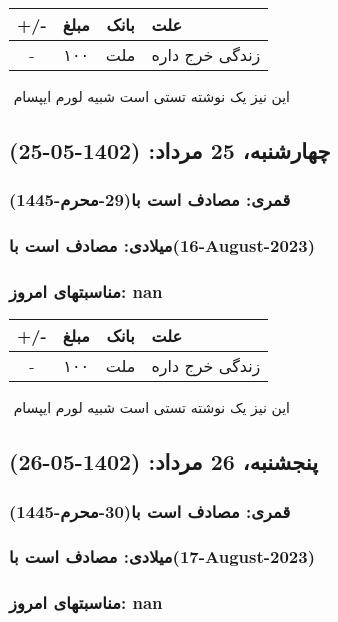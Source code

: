 \documentclass{article}
\newcommand{\rnote}[1]{\marginpar{\textcolor{color}{\StrSubstitute{\##1}{ }{\_}}}}
\newcommand{\myRow}[4]{
    #1 & #2 & #3 & #4 \\ \hline
}
\begin{document}
\begin{tabular}{ | c | c | c | p{5cm} |}
    \hline
    \myRow{ +/- }{مبلغ}{بانک}{علت}
    \myRow{-}{۱۰۰}{ملت}{زندگی خرج داره}
\end{tabular}
\newline
\newline

‌
\rnote{تست}
این نیز یک نوشته تستی است شبیه لورم ایپسام




\newpage
{}
\textcolor{color}{
\section{ چهارشنبه، 25 مرداد: (1402-05-25) }
\subsubsection*{قمری: مصادف است با(29-محرم-1445)} 
\subsubsection*{میلادی: مصادف است با(16-August-2023)}
\subsubsection*{مناسبتهای امروز: nan}
}


\begin{tabular}{ | c | c | c | p{5cm} |}
    \hline
    \myRow{ +/- }{مبلغ}{بانک}{علت}
    \myRow{-}{۱۰۰}{ملت}{زندگی خرج داره}
\end{tabular}
\newline
\newline

‌
\rnote{تست}
این نیز یک نوشته تستی است شبیه لورم ایپسام




\newpage
{}
\textcolor{color}{
\section{ پنجشنبه، 26 مرداد: (1402-05-26) }
\subsubsection*{قمری: مصادف است با(30-محرم-1445)} 
\subsubsection*{میلادی: مصادف است با(17-August-2023)}
\subsubsection*{مناسبتهای امروز: nan}
}
\end{document}
